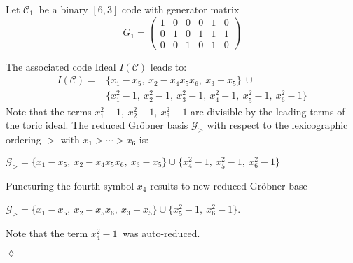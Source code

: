 \begin{env_example} \normalfont
 Let $\mathcal{C}_{1}~$ be a binary $[6,3]$ code with generator matrix
\[
G_{1} =
\begin{pmatrix}
1 & 0 & 0 & 0 & 1 & 0 \\ 
0 & 1 & 0 & 1 & 1 & 1 \\  
0 & 0 & 1 & 0 & 1 & 0  
\end{pmatrix} 
\]

The associated code Ideal $I(\mathcal{C})$ leads to: \newline
\begin{align*}
I(\mathcal{C}) = &\{x_{1}-x_{5},~x_{2}-x_{4}x_{5}x_{6},~x_{3}-x_{5}  \} ~\cup \\ &\{x_{1}^{2}-1,~x_{2}^{2}-1,~x_{3}^{2}-1,~x_{4}^{2}-1,~x_{5}^{2}-1,~x_{6}^{2}-1\}
\end{align*}
Note that the terms $x_{1}^{2}-1,~x_{2}^{2}-1,~x_{3}^{2}-1 $ are divisible by the leading terms of the toric ideal.
The reduced Gröbner basis $\mathcal{G}_{>}$ with respect to the lexicographic ordering $>$ with $x_{1} > \cdots > x_{6}$ is:
\begin{center}
$ \mathcal{G}_{>} = \{x_{1}-x_{5},~x_{2}-x_{4}x_{5}x_{6},~x_{3}-x_{5}  \} \cup \{x_{4}^{2}-1,~x_{5}^{2}-1,~x_{6}^{2}-1  \}  $
\end{center}

Puncturing the fourth symbol $x_4$ results to new reduced Gröbner base 
\begin{center}
$ \mathcal{G}_{>} = \{x_{1}-x_{5},~x_{2}-x_{5}x_{6},~x_{3}-x_{5}  \} \cup \{x_{5}^{2}-1,~x_{6}^{2}-1  \}  $.
\end{center}
Note that the term $x_{4}^{2}-1~$ was auto-reduced.


\begin{flushright}
$\lozenge$
\end{flushright} 

\end{env_example}

 

\newpage
